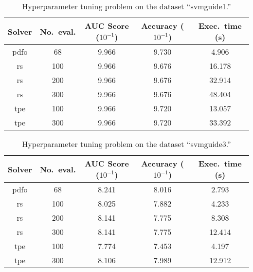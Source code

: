 \documentclass[
    smallextended,  %
    draft,          %
]{svjour3}
\begin{document}
\begin{table}[!ht]
    \caption{Hyperparameter tuning problem on the dataset ``svmguide1.''}
    \centering
    \begin{tabular}{cS[table-format=3]SSS}
        \toprule
        Solver      & {No.\ eval.}  & {AUC Score ($10^{-1}$)}   & {Accuracy ($10^{-1}$)}    & {Exec.\ time (\si{\second})}\\
        \midrule
        \Gls{pdfo}  & 68            & 9.966                     & 9.730                     & 4.906\\
        \Gls{rs}    & 100           & 9.966                     & 9.676                     & 16.178\\
        \Gls{rs}    & 200           & 9.966                     & 9.676                     & 32.914\\
        \Gls{rs}    & 300           & 9.966                     & 9.676                     & 48.404\\
        \Gls{tpe}   & 100           & 9.966                     & 9.720                     & 13.057\\
        \Gls{tpe}   & 300           & 9.966                     & 9.720                     & 33.392\\
        \bottomrule
    \end{tabular}
\end{table}

\begin{table}[!ht]
    \caption{Hyperparameter tuning problem on the dataset ``svmguide3.''}
    \centering
    \begin{tabular}{cS[table-format=3]SSS}
        \toprule
        Solver      & {No.\ eval.}  & {AUC Score ($10^{-1}$)}   & {Accuracy ($10^{-1}$)}    & {Exec.\ time (\si{\second})}\\
        \midrule
        \Gls{pdfo}  & 68            & 8.241                     & 8.016                     & 2.793\\
        \Gls{rs}    & 100           & 8.025                     & 7.882                     & 4.233\\
        \Gls{rs}    & 200           & 8.141                     & 7.775                     & 8.308\\
        \Gls{rs}    & 300           & 8.141                     & 7.775                     & 12.414\\
        \Gls{tpe}   & 100           & 7.774                     & 7.453                     & 4.197\\
        \Gls{tpe}   & 300           & 8.106                     & 7.989                     & 12.912\\
        \bottomrule
    \end{tabular}
\end{table}
\end{document}
